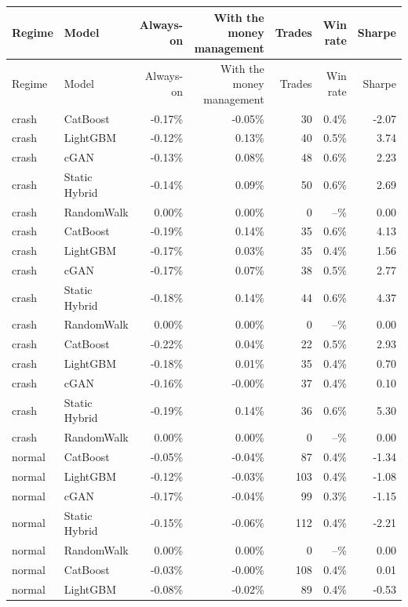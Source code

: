 \documentclass[11pt,a4paper]{article}
\begin{document}
\begin{center}\small
\begin{longtable}{llrrrrr}
\toprule
Regime & Model & Always-on & With the money management & Trades & Win rate & Sharpe \\
\midrule
\endfirsthead
\toprule
Regime & Model & Always-on & With the money management & Trades & Win rate & Sharpe \\
\midrule
\endhead
crash & CatBoost & -0.17\% & -0.05\% & 30 & 0.4\% & -2.07 \\
crash & LightGBM & -0.12\% & 0.13\% & 40 & 0.5\% & 3.74 \\
crash & cGAN & -0.13\% & 0.08\% & 48 & 0.6\% & 2.23 \\
crash & Static Hybrid & -0.14\% & 0.09\% & 50 & 0.6\% & 2.69 \\
crash & RandomWalk & 0.00\% & 0.00\% & 0 & --\% & 0.00 \\
crash & CatBoost & -0.19\% & 0.14\% & 35 & 0.6\% & 4.13 \\
crash & LightGBM & -0.17\% & 0.03\% & 35 & 0.4\% & 1.56 \\
crash & cGAN & -0.17\% & 0.07\% & 38 & 0.5\% & 2.77 \\
crash & Static Hybrid & -0.18\% & 0.14\% & 44 & 0.6\% & 4.37 \\
crash & RandomWalk & 0.00\% & 0.00\% & 0 & --\% & 0.00 \\
crash & CatBoost & -0.22\% & 0.04\% & 22 & 0.5\% & 2.93 \\
crash & LightGBM & -0.18\% & 0.01\% & 35 & 0.4\% & 0.70 \\
crash & cGAN & -0.16\% & -0.00\% & 37 & 0.4\% & 0.10 \\
crash & Static Hybrid & -0.19\% & 0.14\% & 36 & 0.6\% & 5.30 \\
crash & RandomWalk & 0.00\% & 0.00\% & 0 & --\% & 0.00 \\
normal & CatBoost & -0.05\% & -0.04\% & 87 & 0.4\% & -1.34 \\
normal & LightGBM & -0.12\% & -0.03\% & 103 & 0.4\% & -1.08 \\
normal & cGAN & -0.17\% & -0.04\% & 99 & 0.3\% & -1.15 \\
normal & Static Hybrid & -0.15\% & -0.06\% & 112 & 0.4\% & -2.21 \\
normal & RandomWalk & 0.00\% & 0.00\% & 0 & --\% & 0.00 \\
normal & CatBoost & -0.03\% & -0.00\% & 108 & 0.4\% & 0.01 \\
normal & LightGBM & -0.08\% & -0.02\% & 89 & 0.4\% & -0.53 \\

\end{longtable}
\end{center}
\end{document}
